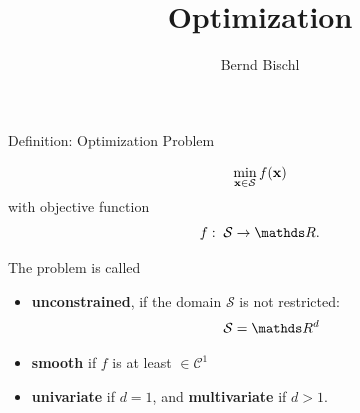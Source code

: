 





\newcommand{\titlefigure}{figure_man/ml_linreg_example_2.pdf}
\newcommand{\learninggoals}{
\item Definition
\item Practical examples}



\title{Optimization}
\author{Bernd Bischl}
\date{}



\sloppy

\begin{vbframe}{Definition: Optimization Problem}

$$
\min_{\mathbf{x} \in \mathcal{S}} f(\mathbf{x})
$$
with objective function
$$
f: \; \mathcal{S} \to \R.
$$

\lz 

The problem is called

\begin{itemize}
	\item \textbf{unconstrained}, if the domain $\mathcal{S}$ is not restricted: 
	$$
		\mathcal{S} = \R^d
	$$
	\item \textbf{smooth} if $f$ is at least $\in \mathcal{C}^1$
	\item \textbf{univariate} if $d = 1$, and \textbf{multivariate} if $d > 1$.  
\end{itemize}

\end{vbframe}


	

